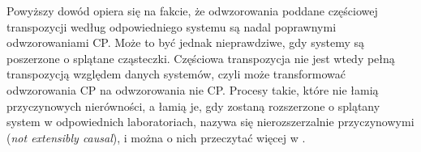 \documentclass[10pt]{article} %
\newcommand{\IO}{\mathbb{1}^\circ}
\begin{document}
Powyższy dowód opiera się na fakcie, że odwzorowania poddane częściowej transpozycji według odpowiedniego systemu są nadal poprawnymi odwzorowaniami CP.
Może to być jednak nieprawdziwe, gdy systemy są poszerzone o splątane cząsteczki. Częściowa transpozycja nie jest wtedy pełną transpozycją względem danych systemów, czyli może transformować odwzorowania CP na odwzorowania nie CP. Procesy takie, które nie łamią przyczynowych nierówności, a łamią je, gdy zostaną rozszerzone o splątany system w odpowiednich laboratoriach, nazywa się nierozszerzalnie przyczynowymi (\textit{not extensibly causal}),
i można o nich przeczytać więcej w \cite{causal_model}.
\end{document}
